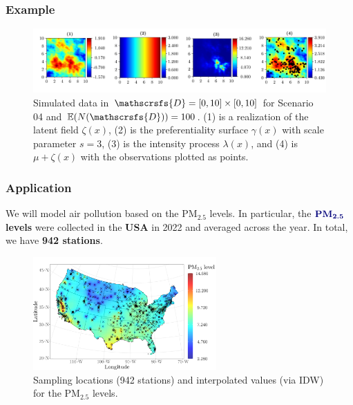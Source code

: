\documentclass[10pt, aspectratio = 169, handout]{beamer} %
\let\oldtextbf\textbf
\renewcommand\textbf[1]{\textcolor{titles}{\oldtextbf{#1}}}
\begin{document}
     \begin{frame}[t]
		\frametitle{Example}
		\justifying

        \begin{figure}[!ht]
        	\centering
        	\includegraphics[width = 1\textwidth]{Images/simulated-example.jpeg}
            \caption{\justifying Simulated data in $\mathscrsfs{D} = [0, 10] \times [0,10]$ for Scenario 04 and $\mathbb{E}(N(\mathscrsfs{D})) = 100$. (1) is a realization of the latent field $\zeta(x)$, (2) is the preferentiality surface $\gamma(x)$ with scale parameter $s = 3$, (3) is the intensity process $\lambda(x)$, and (4) is $\mu + \zeta(x)$ with the observations plotted as points.}
        	\label{fig:simulated-example}
        \end{figure}
	\end{frame}

\begin{frame}[t]
        \frametitle{Application}
		\justifying

        We will model air pollution based on the $\text{PM}_{2.5}$ levels. In particular, the $\text{\textbf{PM}}_{\textbf{2.5}}$ \textbf{levels} were collected in the \textbf{USA} in 2022 and averaged across the year. In total, we have \textbf{942 stations}.

        \vspace{-6pt}

        \begin{figure}[!ht]
        	\centering
        	\includegraphics[width = 0.625\textwidth]{Images/free_assumptions.jpeg} \vspace{-6pt}
            \caption{\justifying Sampling locations (942 stations) and interpolated values (via IDW) for the \hspace{-1pt}$\text{PM}_{2.5}$ levels.}
        	\label{fig:usa_pm25_obs}
        \end{figure}
        
	\end{frame}
\end{document}
